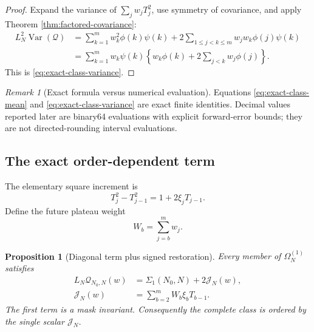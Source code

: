\documentclass[11pt,reqno]{amsart}
\numberwithin{equation}{section}
\theoremstyle{plain}
\newtheorem{proposition}[theorem]{Proposition}
\theoremstyle{definition}
\theoremstyle{remark}
\newtheorem{remark}[theorem]{Remark}
\newcommand{\Var}{\operatorname{Var}}
\newcommand{\Om}{\Omega}
\newcommand{\QF}{\mathcal Q}
\begin{document}
\begin{proof}
Expand the variance of \(\sum_jw_jT_j^2\), use symmetry of covariance, and
apply Theorem \ref{thm:factored-covariance}:
\begin{align}
L_N^2\Var(\QF)
&=\sum_{k=1}^m w_k^2\phi(k)\psi(k)
+2\sum_{1\leq j<k\leq m}w_jw_k\phi(j)\psi(k)
\label{eq:variance-triangular-sum}\\
&=\sum_{k=1}^{m}w_k\psi(k)
\left\{w_k\phi(k)+2\sum_{j<k}w_j\phi(j)\right\}.
\label{eq:variance-prefix-collapse}
\end{align}
This is \eqref{eq:exact-class-variance}.
\end{proof}

\begin{remark}[Exact formula versus numerical evaluation]
\label{rem:exact-versus-binary64}
Equations \eqref{eq:exact-class-mean} and
\eqref{eq:exact-class-variance} are exact finite identities.  Decimal values
reported later are binary64 evaluations with explicit forward-error bounds;
they are not directed-rounding interval evaluations.
\end{remark}

\subsection{The exact order-dependent term}
\label{subsec:order-dependent-term}

The elementary square increment is
\begin{equation}
T_j^2-T_{j-1}^2=1+2\xi_jT_{j-1}.
\label{eq:support-square-increment}
\end{equation}
Define the future plateau weight
\begin{equation}
W_b=\sum_{j=b}^{m}w_j.
\label{eq:future-plateau-weight}
\end{equation}

\begin{proposition}[Diagonal term plus signed restoration]
\label{prop:diagonal-restoration}
Every member of \(\Om_N^{(1)}\) satisfies
\begin{align}
L_N\QF_{N_0,N}(w)
&=\Sigma_1(N_0,N)+2\mathcal J_N(w),
\label{eq:diagonal-restoration}\\
\mathcal J_N(w)
&=\sum_{b=2}^{m}W_b\xi_bT_{b-1}.
\label{eq:restoration-functional}
\end{align}
The first term is a mask invariant.  Consequently the complete class is
ordered by the single scalar \(\mathcal J_N\).
\end{proposition}
\end{document}
